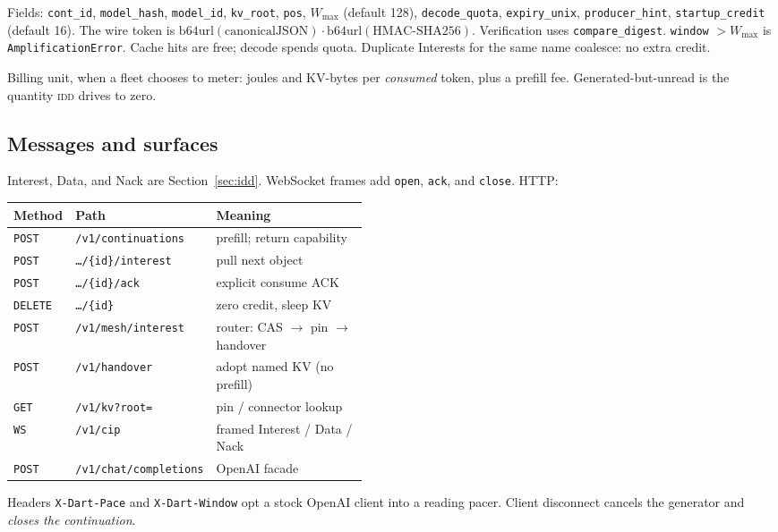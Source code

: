 \documentclass{article}
\theoremstyle{definition}
\newcommand{\idd}{\textsc{idd}}
\newcommand{\kvroot}{\texttt{kv\_root}}
\begin{document}
Fields: \texttt{cont\_id}, \texttt{model\_hash}, \texttt{model\_id}, \kvroot{}, \texttt{pos}, $W_{\max}$ (default 128), \texttt{decode\_quota}, \texttt{expiry\_unix}, \texttt{producer\_hint}, \texttt{startup\_credit} (default 16).
The wire token is $\mathrm{b64url}(\mathrm{canonicalJSON}) \cdot \mathrm{b64url}(\mathrm{HMAC\textrm{-}SHA256})$.
Verification uses \texttt{compare\_digest}.
\texttt{window} $> W_{\max}$ is \texttt{AmplificationError}.
Cache hits are free; decode spends quota.
Duplicate Interests for the same name coalesce: no extra credit.

Billing unit, when a fleet chooses to meter: joules and KV-bytes per \emph{consumed} token, plus a prefill fee.
Generated-but-unread is the quantity \idd{} drives to zero.

\subsection{Messages and surfaces}

Interest, Data, and Nack are Section~\ref{sec:idd}.
WebSocket frames add \texttt{open}, \texttt{ack}, and \texttt{close}.
HTTP:

\begin{center}
\small
\begin{tabular}{llp{0.46\linewidth}}
\toprule
Method & Path & Meaning \\
\midrule
\texttt{POST} & \texttt{/v1/continuations} & prefill; return capability \\
\texttt{POST} & \texttt{\ldots/\{id\}/interest} & pull next object \\
\texttt{POST} & \texttt{\ldots/\{id\}/ack} & explicit consume ACK \\
\texttt{DELETE} & \texttt{\ldots/\{id\}} & zero credit, sleep KV \\
\texttt{POST} & \texttt{/v1/mesh/interest} & router: CAS $\to$ pin $\to$ handover \\
\texttt{POST} & \texttt{/v1/handover} & adopt named KV (no prefill) \\
\texttt{GET} & \texttt{/v1/kv?root=} & pin / connector lookup \\
\texttt{WS} & \texttt{/v1/cip} & framed Interest / Data / Nack \\
\texttt{POST} & \texttt{/v1/chat/completions} & OpenAI facade \\
\bottomrule
\end{tabular}
\end{center}

Headers \texttt{X-Dart-Pace} and \texttt{X-Dart-Window} opt a stock OpenAI client into a reading pacer.
Client disconnect cancels the generator and \emph{closes the continuation}.
\end{document}

